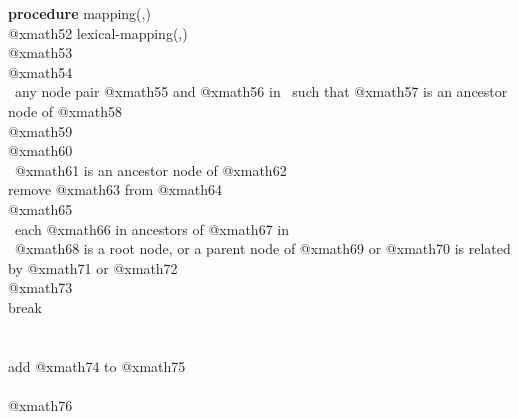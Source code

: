 \begin{figure*}
\raggedright
\small
{\bf procedure} mapping(\Ds,\Dt) \bfbegin\ \\
\hspace{5mm} @xmath52 lexical-mapping(\Ds,\Dt)
\\
\hspace{5mm} @xmath53  \\
\hspace{5mm} @xmath54  \\
\hspace{5mm} \bffor\ any node pair @xmath55 and @xmath56 in \Ds\ such that @xmath57 is an
ancestor node of @xmath58 \bfbegin {} \\
\hspace{10mm} @xmath59 \\
\hspace{10mm} @xmath60 \\
\hspace{10mm} \bfif\ @xmath61 is an ancestor node of @xmath62 \bfthen {}\\
\hspace{15mm} remove @xmath63 from @xmath64 \\
\hspace{15mm} @xmath65 \\
\hspace{15mm} \bffor\ each @xmath66 in ancestors of @xmath67 in \Dt\ \bfbegin
{}\\  
\hspace{20mm} \bfif\ @xmath68 is a root node, or a parent node of @xmath69 or @xmath70 is related by
@xmath71 or @xmath72 \bfthen\ \bfbegin\ \\
\hspace{30mm} @xmath73 \\
\hspace{30mm} break \\
\hspace{20mm} \bfend\ \\
\hspace{15mm} \bfend\ \\
\hspace{15mm} add @xmath74 to @xmath75 \\
\hspace{10mm} \bfend\ \\
\hspace{10mm} @xmath76 \\

\end{figure*}
